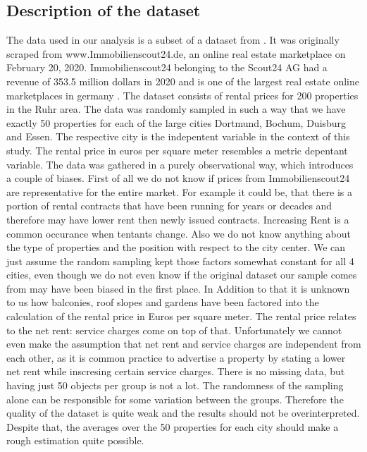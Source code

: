 \documentclass[12 pt]{scrartcl}
\begin{document}
\subsection{Description of the dataset}

The data used in our analysis is a subset of a dataset from \citet{kaggle}. It was originally scraped from www.Immobilienscout24.de, an online real estate marketplace on February 20, 2020. Immobilienscout24 belonging to the Scout24 AG had a revenue of 353.5 million dollars in 2020 and is one of the largest real estate online marketplaces in germany \citep{statista}.
The dataset consists of rental prices for 200 properties in the Ruhr area. The data was randomly sampled in such a way that we have exactly 50 properties for each of the large cities Dortmund, Bochum, Duisburg and Essen. The respective city is the indepentent variable in the context of this study. The rental price in euros per square meter resembles a metric depentant variable. The data was gathered in a purely observational way, which introduces a couple of biases. First of all we do not know if prices from Immobilienscout24 are representative for the entire market. For example it could be, that there is a portion of rental contracts that have been running for years or decades and therefore may have lower rent then newly issued contracts. Increasing Rent is a common occurance when tentants change. Also we do not know anything about the type of properties and the position with respect to the city center. We can just assume the random sampling kept those factors somewhat constant for all 4 cities, even though we do not even know if the original dataset our sample comes from may have been biased in the first place. In Addition to that it is unknown to us how balconies, roof slopes and gardens have been factored into the calculation of the rental price in Euros per square meter.
The rental price relates to the net rent: service charges come on top of that. Unfortunately we cannot even make the assumption that net rent and service charges are independent from each other, as it is common practice to advertise a property by stating a lower net rent while inscresing certain service charges.
There is no missing data, but having just 50 objects per group is not a lot. The randomness of the sampling alone can be responsible for some variation between the groups.
Therefore the quality of the dataset is quite weak and the results should not be overinterpreted. Despite that, the averages over the 50 properties for each city should make a rough estimation quite possible.
\end{document}
